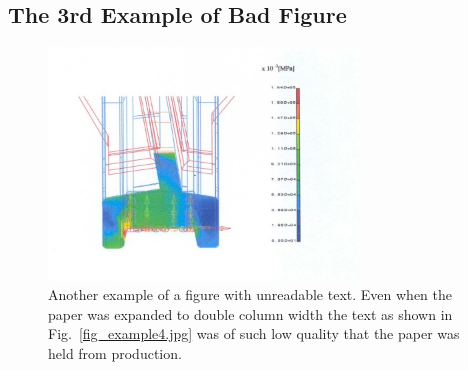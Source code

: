 \documentclass[twocolumn,10pt]{asme2ej}
\begin{document}
\subsection{The 3rd Example of Bad Figure}
\begin{figure} 
\centerline{\includegraphics[width=3.25in]{figure/FMANU_MD_04_1274_13.jpg}}
\caption{Another example of a figure with unreadable text.  Even when the paper was expanded to double column width the text as shown in Fig.~\ref{fig_example4.jpg} was of such low quality that the paper was held from production.}
\label{fig_example3.jpg}
\end{figure}
\end{document}
